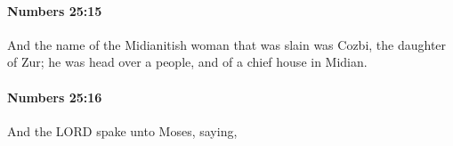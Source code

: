 		\paragraph{Numbers 25:15} %
			\label{NUMBERS-25-15}

			And the name of the Midianitish woman that was slain was Cozbi, the daughter of Zur; he was head over a people, and of a chief house in Midian.


		\paragraph{Numbers 25:16} %
			\label{NUMBERS-25-16}

			And the LORD spake unto Moses, saying,


